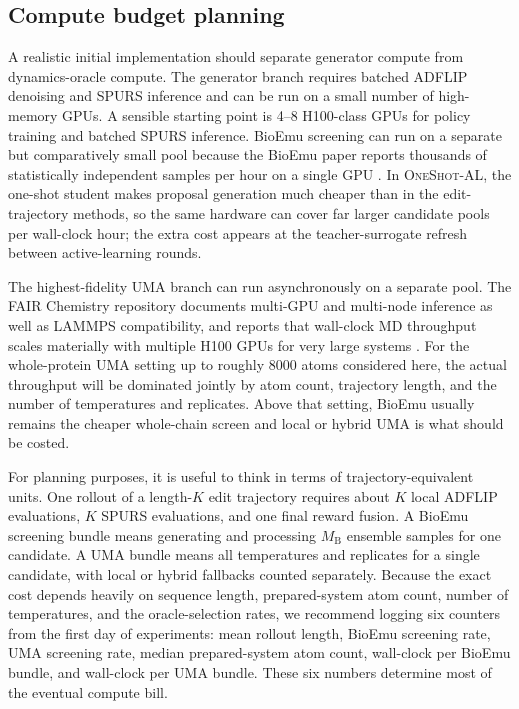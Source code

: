 \documentclass[11pt]{article}
\newcommand{\methodIII}{\textsc{OneShot-AL}}
\begin{document}
\subsection{Compute budget planning}

A realistic initial implementation should separate generator compute from dynamics-oracle compute. The generator branch requires batched ADFLIP denoising and SPURS inference and can be run on a small number of high-memory GPUs. A sensible starting point is 4--8 H100-class GPUs for policy training and batched SPURS inference. BioEmu screening can run on a separate but comparatively small pool because the BioEmu paper reports thousands of statistically independent samples per hour on a single GPU \citep{lewis2024bioemu}. In \methodIII{}, the one-shot student makes proposal generation much cheaper than in the edit-trajectory methods, so the same hardware can cover far larger candidate pools per wall-clock hour; the extra cost appears at the teacher-surrogate refresh between active-learning rounds.

The highest-fidelity UMA branch can run asynchronously on a separate pool. The FAIR Chemistry repository documents multi-GPU and multi-node inference as well as LAMMPS compatibility, and reports that wall-clock MD throughput scales materially with multiple H100 GPUs for very large systems \citep{fairchem2025github}. For the whole-protein UMA setting up to roughly $8000$ atoms considered here, the actual throughput will be dominated jointly by atom count, trajectory length, and the number of temperatures and replicates. Above that setting, BioEmu usually remains the cheaper whole-chain screen and local or hybrid UMA is what should be costed.

For planning purposes, it is useful to think in terms of trajectory-equivalent units. One rollout of a length-$K$ edit trajectory requires about $K$ local ADFLIP evaluations, $K$ SPURS evaluations, and one final reward fusion. A BioEmu screening bundle means generating and processing $M_{\mathrm B}$ ensemble samples for one candidate. A UMA bundle means all temperatures and replicates for a single candidate, with local or hybrid fallbacks counted separately. Because the exact cost depends heavily on sequence length, prepared-system atom count, number of temperatures, and the oracle-selection rates, we recommend logging six counters from the first day of experiments: mean rollout length, BioEmu screening rate, UMA screening rate, median prepared-system atom count, wall-clock per BioEmu bundle, and wall-clock per UMA bundle. These six numbers determine most of the eventual compute bill.
\end{document}
